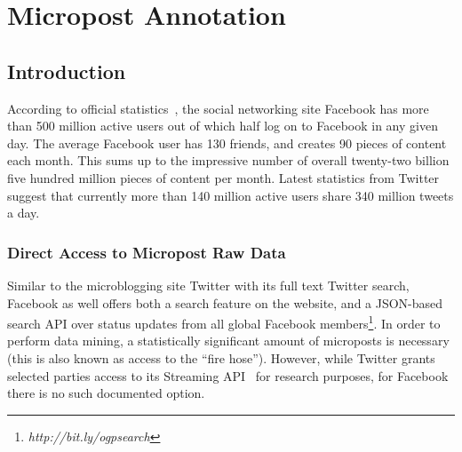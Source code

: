 

\chapter{Micropost Annotation}

\ifpdf
    \graphicspath{{4_micropost_annotation/figures/PNG/}{4_micropost_annotation/figures/PDF/}{4_micropost_annotation/figures/}}
\else
    \graphicspath{{4_micropost_annotation/figures/EPS/}{4_micropost_annotation/figures/}}
\fi


\section{Introduction}                                                      \label{sec:introduction}
According to official statistics~\cite{Facebook}, the social networking site Facebook has more than 500 million active users out of which half log on to Facebook in any given day. The average Facebook user has 130 friends, and creates 90 pieces of content each month. This sums up to the impressive number of overall twenty-two billion five hundred million pieces of content per month. 
Latest statistics from Twitter~\cite{TweetStats} suggest that currently more than 140 million active users share 340 million tweets a day. 

\subsection{Direct Access to Micropost Raw Data}
Similar to the microblogging site Twitter with its full text Twitter search, Facebook as well offers both a search feature on the website, and a JSON-based search API over status updates from all global Facebook members\footnote{\textit{http://bit.ly/ogpsearch}}. In order to perform data mining, a statistically significant amount of microposts is necessary (this is also known as access to the ``fire hose''). However, while Twitter grants selected parties access to its Streaming API~\cite{Twitter} for research purposes, for Facebook there is no such documented option.


